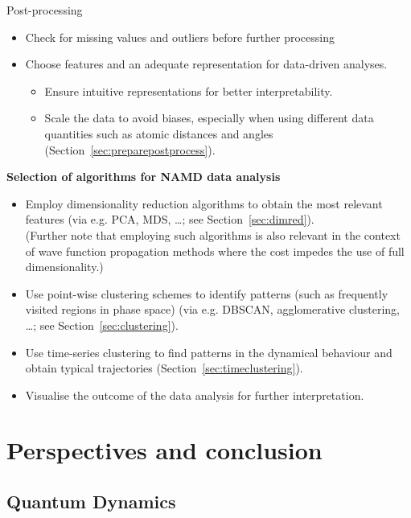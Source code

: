 \documentclass[9pt,bestpractices]{livecoms}
\begin{document}
\begin{Checklists*}[p!]
\begin{checklist}{Post-processing}
\begin{itemize}
\item Check for missing values and outliers before further processing
\item Choose features and an adequate representation for data-driven analyses.
\begin{itemize}
\item Ensure intuitive representations for better interpretability.
\item Scale the data to avoid biases, especially when using different data quantities such as atomic distances and angles (Section~\ref{sec:preparepostprocess}).
\end{itemize}
\end{itemize}
\textbf{Selection of algorithms for NAMD data analysis}
\begin{itemize}
\item Employ dimensionality reduction algorithms to obtain the most relevant features (via e.g. PCA, MDS, \dots; see Section~\ref{sec:dimred}). \\(Further note that employing such algorithms is also relevant in the context of wave function propagation methods where the cost impedes the use of full dimensionality.)
\item Use point-wise clustering schemes to identify patterns (such as frequently visited regions in phase space) (via e.g. DBSCAN, agglomerative clustering, \dots; see Section~\ref{sec:clustering}).
\item Use time-series clustering to find patterns in the dynamical behaviour and obtain typical trajectories (Section~\ref{sec:timeclustering}).
\item Visualise the outcome of the data analysis for further interpretation.
\end{itemize}
\end{checklist}

\end{Checklists*}

\clearpage
\section{Perspectives and conclusion}

\subsection{Quantum Dynamics}
\end{document}
